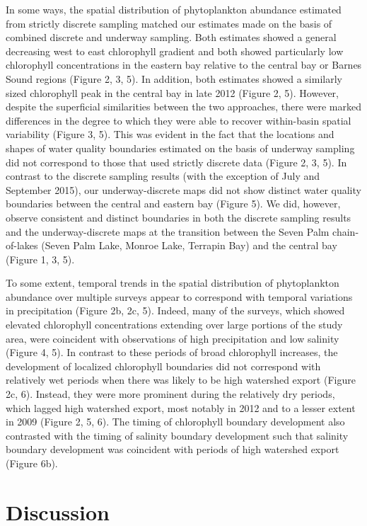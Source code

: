 \documentclass[review]{elsarticle}
\begin{document}
In some ways, the spatial distribution of phytoplankton abundance estimated from strictly discrete sampling matched our estimates made on the basis of combined discrete and underway sampling. Both estimates showed a general decreasing west to east chlorophyll gradient and both showed particularly low chlorophyll concentrations in the eastern bay relative to the central bay or Barnes Sound regions (Figure 2, 3, 5). In addition, both estimates showed a similarly sized chlorophyll peak in the central bay in late 2012 (Figure 2, 5). However, despite the superficial similarities between the two approaches, there were marked differences in the degree to which they were able to recover within-basin spatial variability (Figure 3, 5). This was evident in the fact that the locations and shapes of water quality boundaries estimated on the basis of underway sampling did not correspond to those that used strictly discrete data (Figure 2, 3, 5). In contrast to the discrete sampling results (with the exception of July and September 2015), our underway-discrete maps did not show distinct water quality boundaries between the central and eastern bay (Figure 5). We did, however, observe consistent and distinct boundaries in both the discrete sampling results and the underway-discrete maps at the transition between the Seven Palm chain-of-lakes (Seven Palm Lake, Monroe Lake, Terrapin Bay) and the central bay (Figure 1, 3, 5). 

To some extent, temporal trends in the spatial distribution of phytoplankton abundance over multiple surveys appear to correspond with temporal variations in precipitation (Figure 2b, 2c, 5). Indeed, many of the surveys, which showed elevated chlorophyll concentrations extending over large portions of the study area, were coincident with observations of high precipitation and low salinity (Figure 4, 5). In contrast to these periods of broad chlorophyll increases, the development of localized chlorophyll boundaries did not correspond with relatively wet periods when there was likely to be high watershed export (Figure 2c, 6). Instead, they were more prominent during the relatively dry periods, which lagged high watershed export, most notably in 2012 and to a lesser extent in 2009 (Figure 2, 5, 6). The timing of chlorophyll boundary development also contrasted with the timing of salinity boundary development such that salinity boundary development was coincident with periods of high watershed export (Figure 6b).

\section{Discussion}
\end{document}
